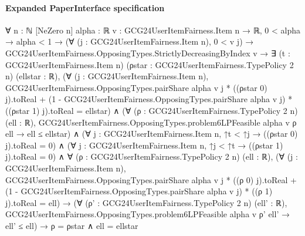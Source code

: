 \documentclass[10pt]{article}
\begin{document}
\paragraph{Expanded PaperInterface specification}
\begin{ReviewVerbatim}
∀ {n : ℕ} [NeZero n] {alpha : ℝ} {v : GCG24UserItemFairness.Item n → ℝ},
  0 < alpha →
    alpha < 1 →
      (∀ (j : GCG24UserItemFairness.Item n), 0 < v j) →
        GCG24UserItemFairness.OpposingTypes.StrictlyDecreasingByIndex v →
          ∃ (t : GCG24UserItemFairness.Item n) (ρstar : GCG24UserItemFairness.TypePolicy 2 n) (ellstar : ℝ),
            (∀ (j : GCG24UserItemFairness.Item n),
                GCG24UserItemFairness.OpposingTypes.pairShare alpha v j * ((ρstar 0) j).toReal +
                    (1 - GCG24UserItemFairness.OpposingTypes.pairShare alpha v j) * ((ρstar 1) j).toReal =
                  ellstar) ∧
              (∀ (ρ : GCG24UserItemFairness.TypePolicy 2 n) (ell : ℝ),
                  GCG24UserItemFairness.OpposingTypes.problem6LPFeasible alpha v ρ ell → ell ≤ ellstar) ∧
                (∀ {j : GCG24UserItemFairness.Item n}, ↑t < ↑j → ((ρstar 0) j).toReal = 0) ∧
                  (∀ {j : GCG24UserItemFairness.Item n}, ↑j < ↑t → ((ρstar 1) j).toReal = 0) ∧
                    ∀ (ρ : GCG24UserItemFairness.TypePolicy 2 n) (ell : ℝ),
                      (∀ (j : GCG24UserItemFairness.Item n),
                          GCG24UserItemFairness.OpposingTypes.pairShare alpha v j * ((ρ 0) j).toReal +
                              (1 - GCG24UserItemFairness.OpposingTypes.pairShare alpha v j) * ((ρ 1) j).toReal =
                            ell) →
                        (∀ (ρ' : GCG24UserItemFairness.TypePolicy 2 n) (ell' : ℝ),
                            GCG24UserItemFairness.OpposingTypes.problem6LPFeasible alpha v ρ' ell' → ell' ≤ ell) →
                          ρ = ρstar ∧ ell = ellstar
\end{ReviewVerbatim}
\end{document}
